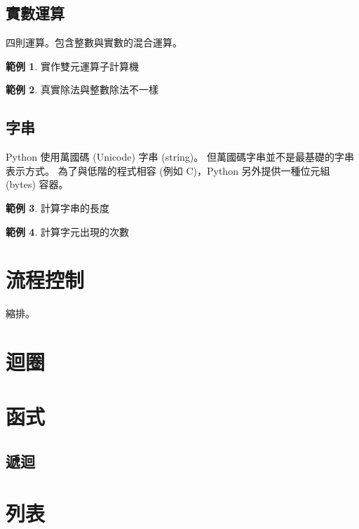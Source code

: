 \documentclass[a4paper,12pt]{book}
\theoremstyle{definition}
\newtheorem{example}{範例}[chapter]
\begin{document}
\section{實數運算}

四則運算。包含整數與實數的混合運算。

\begin{example}
實作雙元運算子計算機
\end{example}

\begin{example}
真實除法與整數除法不一樣
\end{example}

\section{字串}

Python 使用萬國碼 (Unicode) 字串 (string)。
但萬國碼字串並不是最基礎的字串表示方式。
為了與低階的程式相容 (例如 C)，Python 另外提供一種位元組 (bytes) 容器。

\begin{example}
計算字串的長度
\end{example}

\begin{example}
計算字元出現的次數
\end{example}

\chapter{流程控制}
%
\label{c:flow}

縮排。

\chapter{迴圈}
%
\label{c:loop}

\chapter{函式}
%
\label{c:function}

\section{遞迴}

\chapter{列表}
%
\label{c:list}
\end{document}
